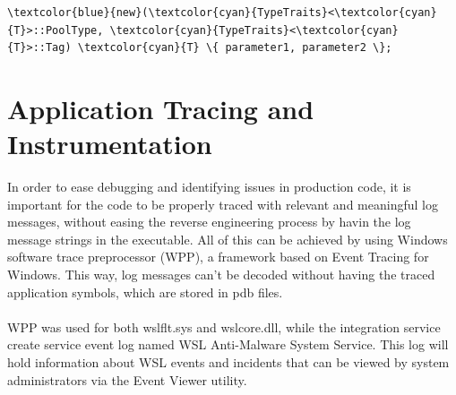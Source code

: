 \begin{Verbatim}[fontsize=\small, commandchars=\\\{\}]
    \textcolor{blue}{new}(\textcolor{cyan}{TypeTraits}<\textcolor{cyan}{T}>::PoolType, \textcolor{cyan}{TypeTraits}<\textcolor{cyan}{T}>::Tag) \textcolor{cyan}{T} \{ parameter1, parameter2 \};
\end{Verbatim}

    \section{Application Tracing and Instrumentation}
        In order to ease debugging and identifying issues in production code, it is important for the code to be properly traced with relevant
        and meaningful log messages, without easing the reverse engineering process by havin the log message strings in the executable. All of
        this can be achieved by using Windows software trace preprocessor (WPP), a framework based on Event Tracing for Windows. This way, 
        log messages can't be decoded without having the traced application symbols, which are stored in pdb files.

        \paragraph{}
        WPP was used for both wslflt.sys and wslcore.dll, while the integration service create service event log named WSL Anti-Malware System 
        Service. This log will hold information about WSL events and incidents that can be viewed by system administrators via the Event Viewer
        utility.